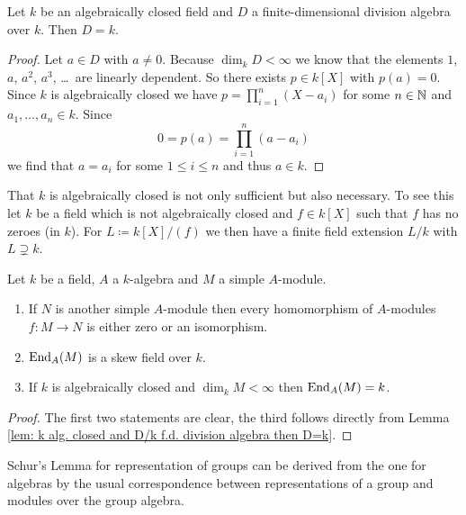 \begin{lem}\label{lem: k alg. closed and D/k f.d. division algebra then D=k}
 Let $k$ be an algebraically closed field and $D$ a finite-dimensional division algebra over $k$. Then $D = k$.
\end{lem}
\begin{proof}
 Let $a \in D$ with $a \neq 0$. Because $\dim_k D < \infty$ we know that the elements $1$, $a$, $a^2$, $a^3$, \dots\ are linearly dependent. So there exists $p \in k[X]$ with $p(a) = 0$. Since $k$ is algebraically closed we have $p = \prod_{i=1}^n (X-a_i)$ for some $n \in \mathbb{N}$ and $a_1, \dotsc, a_n \in k$. Since
 \[
  0 = p(a) = \prod_{i=1}^n (a-a_i)
 \]
 we find that $a = a_i$ for some $1 \leq i \leq n$ and thus $a \in k$.
\end{proof}


\begin{rem}
 That $k$ is algebraically closed is not only sufficient but also necessary. To see this let $k$ be a field which is not algebraically closed and $f \in k[X]$ such that $f$ has no zeroes (in $k$). For $L \coloneqq k[X]/(f)$ we then have a finite field extension $L/k$ with $L \supsetneq k$.
\end{rem}


\begin{lem}
 Let $k$ be a field, $A$ a $k$-algebra and $M$ a simple $A$-module.
 \begin{enumerate}[label=\emph{\alph*)},leftmargin=*]
  \item
   If $N$ is another simple $A$-module then every homomorphism of $A$-modules $f \colon M \to N$ is either zero or an isomorphism.
  \item
   $\operatorname{End}_A(M)$ is a skew field over $k$.
  \item
   If $k$ is algebraically closed and $\dim_k M < \infty$ then $\operatorname{End}_A(M) = k$.
 \end{enumerate}
\end{lem}
\begin{proof}
 The first two statements are clear, the third follows directly from Lemma \ref{lem: k alg. closed and D/k f.d. division algebra then D=k}.
\end{proof}


\begin{rem}
 Schur’s Lemma for representation of groups can be derived from the one for algebras by the usual correspondence between representations of a group and modules over the group algebra.
\end{rem}



